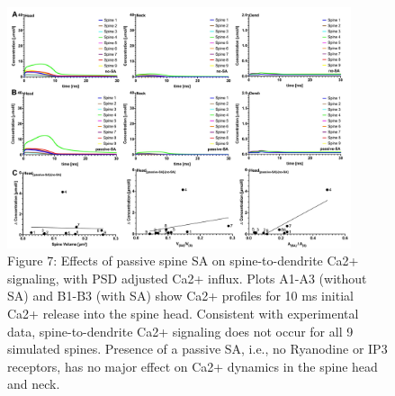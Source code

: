 \documentclass[fleqn,10pt]{wlscirep}
\begin{document}
\begin{figure}[ht!]
\centering
\includegraphics[width=0.9\textwidth]{images/figure7.jpg}
\caption{{\small Figure 7: Effects of passive spine SA on spine-to-dendrite Ca2+ signaling, with PSD adjusted Ca2+ influx.  Plots A1-A3 (without  SA) and B1-B3 (with SA) show Ca2+ profiles for 10 ms initial Ca2+ release into the spine head.  Consistent with experimental data, spine-to-dendrite Ca2+ signaling does not occur for all 9 simulated spines. Presence of a passive SA, i.e., no Ryanodine or IP3 receptors, has no major effect on Ca2+ dynamics in the spine head and neck.}}
\end{figure}
\end{document}
